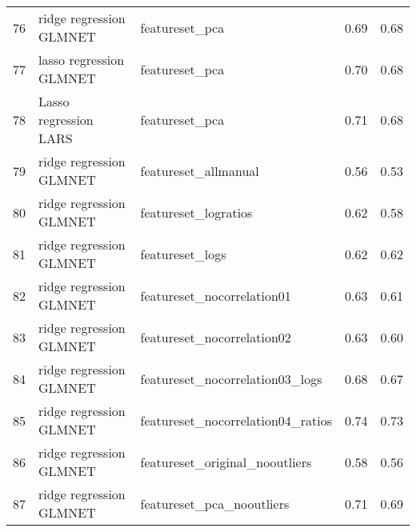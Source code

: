 \begin{tabular}{cllcc}
  76 & ridge regression GLMNET & featureset\_pca & 0.69 & 0.68 \\ 
  77 & lasso regression GLMNET & featureset\_pca & 0.70 & 0.68 \\ 
  78 & Lasso regression LARS & featureset\_pca & 0.71 & 0.68 \\ 
  79 & ridge regression GLMNET & featureset\_allmanual & 0.56 & 0.53 \\ 
  80 & ridge regression GLMNET & featureset\_logratios & 0.62 & 0.58 \\ 
  81 & ridge regression GLMNET & featureset\_logs & 0.62 & 0.62 \\ 
  82 & ridge regression GLMNET & featureset\_nocorrelation01 & 0.63 & 0.61 \\ 
  83 & ridge regression GLMNET & featureset\_nocorrelation02 & 0.63 & 0.60 \\ 
  84 & ridge regression GLMNET & featureset\_nocorrelation03\_logs & 0.68 & 0.67 \\ 
  85 & ridge regression GLMNET & featureset\_nocorrelation04\_ratios & 0.74 & 0.73 \\ 
  86 & ridge regression GLMNET & featureset\_original\_nooutliers & 0.58 & 0.56 \\ 
  87 & ridge regression GLMNET & featureset\_pca\_nooutliers & 0.71 & 0.69 \\ 
     \hline
\end{tabular}

